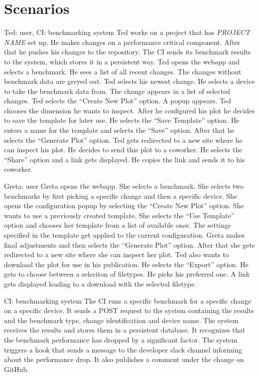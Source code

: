 \section{Scenarios}

{Ted: \Gls{user}, CI: \Gls{benchmarking system}}
{Ted works on a project that has \emph{PROJECT NAME} set up. He makes changes on a performance critical component. After that he pushes his changes to the repository. The CI sends its benchmark results to the system, which stores it in a persistent way. Ted opens the webapp and selects a benchmark. He sees a list of all recent changes. The changes without benchmark data are greyed out. Ted selects his newest change. He selects a device to take the benchmark data from. The change appears in a list of selected changes. Ted selects the \enquote{Create New Plot} option. A popup appears. Ted chooses the dimension he wants to inspect. After he configured his plot he decides to save the \gls{template} for later use. He selects the \enquote{Save Template} option. He enters a name for the \gls{template} and selects the \enquote{Save} option. After that he selects the \enquote{Generate Plot} option. Ted gets redirected to a new site where he can inspect his plot. He decides to send this plot to a coworker. He selects the \enquote{Share} option and a link gets displayed. He copies the link and sends it to his coworker.}

{Greta: \Gls{user}}
{Greta opens the webapp. She selects a benchmark. She selects two benchmarks by first picking a specific change and then a specific device. She opens the configuration popup by selecting the \enquote{Create New Plot} option. She wants to use a previously created \gls{template}. She selects the \enquote{Use Template} option and chooses her \gls{template} from a list of available ones. The settings specified in the \gls{template} get applied to the current \gls{configuration}. Greta makes final adjustments and then selects the \enquote{Generate Plot} option. After that she gets redirected to a new site where she can inspect her plot. Ted also wants to download the plot for use in his publication. He selects the \enquote{Export} option. He gets to choose between a seleciton of filetypes. He picks his preferred one. A link gets displayed leading to a download with the selected filetype.}

{CI: \Gls{benchmarking system}}
{The CI runs a specific benchmark for a specific change on a specific device. It sends a POST request to the system containing the results and the benchmark type, change identification and device name. The system receives the results and stores them in a persistent database. It recognizes that the benchmark performance has dropped by a significant factor. The system triggers a hook that sends a message to the developer slack channel informing about the performance drop. It also publishes a comment under the change on GitHub.}

